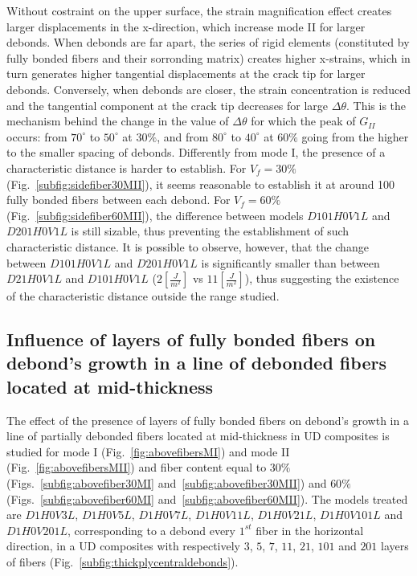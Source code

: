 \documentclass[review]{elsarticle}
\begin{document}
Without costraint on the upper surface, the strain magnification effect creates larger displacements in the x-direction, which increase mode II for larger debonds. When debonds are far apart, the series of rigid elements (constituted by fully bonded fibers and their sorronding matrix) creates higher x-strains, which in turn generates higher tangential displacements at the crack tip for larger debonds. Conversely, when debonds are closer, the strain concentration is reduced and the tangential component at the crack tip decreases for large $\Delta\theta$. This is the mechanism behind the change in the value of $\Delta\theta$ for which the peak of $G_{II}$ occurs: from $70^{\circ}$ to $50^{\circ}$ at $30\%$, and from $80^{\circ}$ to $40^{\circ}$ at $60\%$ going from the higher to the smaller spacing of debonds. Differently from mode I, the presence of a characteristic distance is harder to establish. For $V_{f}=30\%$ (Fig.~\ref{subfig:sidefiber30MII}), it seems reasonable to establish it at around 100 fully bonded fibers between each debond. For $V_{f}=60\%$ (Fig.~\ref{subfig:sidefiber60MII}), the difference between models $D101H0V1L$ and $D201H0V1L$ is still sizable, thus preventing the establishment of such characteristic distance. It is possible to observe, however, that the change between $D101H0V1L$ and $D201H0V1L$ is significantly smaller than between $D21H0V1L$ and $D101H0V1L$ ($2\left[\frac{J}{m^{2}}\right]$ vs $11\left[\frac{J}{m^{2}}\right]$), thus suggesting the existence of the characteristic distance outside the range studied.

\subsection{Influence of layers of fully bonded fibers on debond's growth in a line of debonded fibers located at mid-thickness}

The effect of the presence of layers of fully bonded fibers on debond's growth in a line of partially debonded fibers located at mid-thickness in UD composites is studied for mode I (Fig.~\ref{fig:abovefibersMI}) and mode II (Fig.~\ref{fig:abovefibersMII}) and fiber content equal to $30\%$ (Figs.~\ref{subfig:abovefiber30MI} and~\ref{subfig:abovefiber30MII}) and $60\%$ (Figs.~\ref{subfig:abovefiber60MI} and~\ref{subfig:abovefiber60MII}). The models treated are $D1H0V3L$, $D1H0V5L$, $D1H0V7L$, $D1H0V11L$, $D1H0V21L$, $D1H0V101L$ and $D1H0V201L$, corresponding to a debond every $1^{st}$ fiber in the horizontal direction, in a UD composites with respectively $3$, $5$, $7$, $11$, $21$, $101$ and $201$ layers of fibers (Fig.~\ref{subfig:thickplycentraldebonds}).
\end{document}
